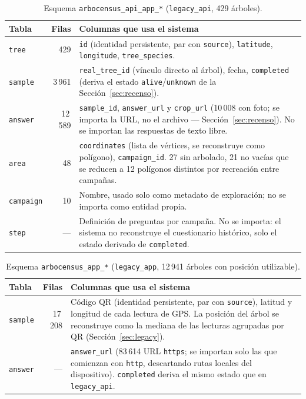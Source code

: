 \begin{table}[H]
  \centering
  \caption{Esquema \texttt{arbocensus\_api\_app\_*} (\texttt{legacy\_api}, 429 árboles).}
  \small
  \begin{tabularx}{\textwidth}{@{}l r X@{}}
    \toprule
    Tabla & Filas & Columnas que usa el sistema \\
    \midrule
    \texttt{tree} & 429 &
      \texttt{id} (identidad persistente, par con \texttt{source}), \texttt{latitude},
      \texttt{longitude}, \texttt{tree\_species}. \\
    \texttt{sample} & 3\,961 &
      \texttt{real\_tree\_id} (vínculo directo al árbol), fecha, \texttt{completed} (deriva el
      estado \texttt{alive}/\texttt{unknown} de la Sección~\ref{sec:recenso}). \\
    \texttt{answer} & 12\,589 &
      \texttt{sample\_id}, \texttt{answer\_url} y \texttt{crop\_url} (10\,008 con foto; se importa
      la URL, no el archivo --- Sección~\ref{sec:recenso}). No se importan las respuestas de texto
      libre. \\
    \texttt{area} & 48 &
      \texttt{coordinates} (lista de vértices, se reconstruye como polígono), \texttt{campaign\_id}.
      27 sin arbolado, 21 no vacías que se reducen a 12 polígonos distintos por recreación entre
      campañas. \\
    \texttt{campaign} & 10 &
      Nombre, usado solo como metadato de exploración; no se importa como entidad propia. \\
    \texttt{step} & --- &
      Definición de preguntas por campaña. No se importa: el sistema no reconstruye el cuestionario
      histórico, solo el estado derivado de \texttt{completed}. \\
    \bottomrule
  \end{tabularx}
\end{table}

\begin{table}[H]
  \centering
  \caption{Esquema \texttt{arbocensus\_app\_*} (\texttt{legacy\_app}, 12\,941 árboles con posición
    utilizable).}
  \small
  \begin{tabularx}{\textwidth}{@{}l r X@{}}
    \toprule
    Tabla & Filas & Columnas que usa el sistema \\
    \midrule
    \texttt{sample} & 17\,208 &
      Código QR (identidad persistente, par con \texttt{source}), latitud y longitud de cada lectura
      de GPS. La posición del árbol se reconstruye como la mediana de las lecturas agrupadas por QR
      (Sección~\ref{sec:legacy}). \\
    \texttt{answer} & --- &
      \texttt{answer\_url} (83\,614 URL \texttt{https}; se importan solo las que comienzan con
      \texttt{http}, descartando rutas locales del dispositivo). \texttt{completed} deriva el mismo
      estado que en \texttt{legacy\_api}. \\
    \bottomrule
  \end{tabularx}
\end{table}

